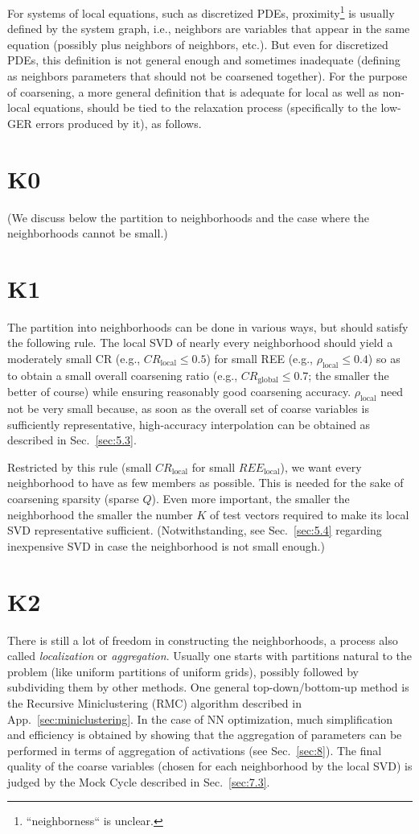 \documentclass{article} %
\begin{document}
For systems of local equations, such as discretized PDEs, proximity\footnote{``neighborness`` is unclear.} is usually defined by the system graph, i.e., neighbors are variables that appear in the same equation (possibly plus neighbors of neighbors, etc.). But even for discretized PDEs, this definition is not general enough and sometimes inadequate (defining as neighbors parameters that should not be coarsened together). For the purpose of coarsening, a more general definition that is adequate for local as well as non-local equations, should be tied to the relaxation process (specifically to the low-GER errors produced by it), as follows.

\section{K0}
(We discuss below the partition to neighborhoods and the case where the neighborhoods cannot be small.)

\section{K1}
The partition into neighborhoods can be done in various ways, but should satisfy the following rule. The local SVD of nearly every neighborhood should yield a moderately small CR (e.g., $CR_{\text{local}} \leq 0.5$) for small REE (e.g., $\rho_{\text{local}} \leq 0.4$) so as to obtain a small overall coarsening ratio (e.g., $CR_{\text{global}} \leq 0.7$; the smaller the better of course) while ensuring reasonably good coarsening accuracy. $\rho_{\text{local}}$ need not be very small because, as soon as the overall set of coarse variables is sufficiently representative, high-accuracy interpolation can be obtained as described in Sec.~\ref{sec:5.3}.

Restricted by this rule (small $CR_{\text{local}}$ for small $REE_{\text{local}}$), we want every neighborhood to have as few members as possible. This is needed for the sake of coarsening sparsity (sparse $Q$). Even more important, the smaller the neighborhood the smaller the number $K$ of test vectors required to make its local SVD representative sufficient. (Notwithstanding, see Sec.~\ref{sec:5.4} regarding inexpensive SVD in case the neighborhood is not small enough.)

\section{K2}
There is still a lot of freedom in constructing the neighborhoods, a process also called {\it localization} or {\it aggregation}. Usually one starts with partitions natural to the problem (like uniform partitions of uniform grids), possibly followed by subdividing them by other methods. One general top-down/bottom-up method is the Recursive Miniclustering (RMC) algorithm described in App.~\ref{sec:miniclustering}. In the case of NN optimization, much simplification and efficiency is obtained by showing that the aggregation of parameters can be performed in terms of aggregation of activations (see Sec.~\ref{sec:8}). The final quality of the coarse variables (chosen for each neighborhood by the local SVD) is judged by the Mock Cycle described in Sec.~\ref{sec:7.3}.
\end{document}

